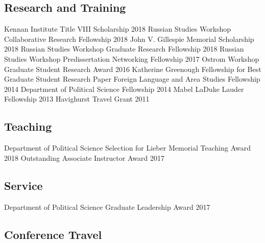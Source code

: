 \documentclass[11pt,]{article}
\begin{document}
\hypertarget{research-and-training}{%
\subsection{Research and Training}\label{research-and-training}}

Kennan Institute Title VIII Scholarship \hfill 2018 \newline Russian
Studies Workshop Collaborative Research Fellowship \hfill 2018 \newline
John V. Gillespie Memorial Scholarship \hfill 2018 \newline Russian
Studies Workshop Graduate Research Fellowship \hfill 2018 \newline
Russian Studies Workshop Predissertation Networking Fellowship
\hfill 2017 \newline Ostrom Workshop Graduate Student Research Award
\hfill 2016 \newline Katherine Greenough Fellowship for Best Graduate
Student Research Paper  \newline Foreign Language and Area
Studies Fellowship \hfill 2014 \newline Department of Political Science
Fellowship \hfill 2014 \newline Mabel LaDuke Lauder Fellowship
\hfill 2013 \newline Havighurst Travel Grant \hfill 2011

\hypertarget{teaching}{%
\subsection{Teaching}\label{teaching}}

Department of Political Science Selection for Lieber Memorial Teaching
Award \hfill 2018 \newline Outstanding Associate Instructor Award
\hfill 2017

\hypertarget{service}{%
\subsection{Service}\label{service}}

Department of Political Science Graduate Leadership Award \hfill 2017

\hypertarget{conference-travel}{%
\subsection{Conference Travel}\label{conference-travel}}
\end{document}
